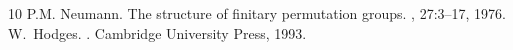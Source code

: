 \begin{thebibliography}{10}
P.M. Neumann.
\newblock The structure of finitary permutation groups.
, 27:3--17, 1976.
W.~Hodges.
.
\newblock Cambridge University Press, 1993.
\end{thebibliography}
